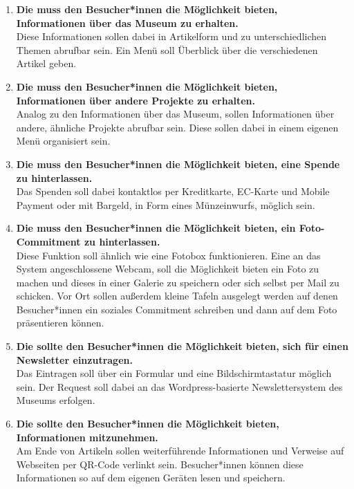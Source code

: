 \begin{enumerate}[label=\textbf{FA\arabic*}]
	\item\label{fa1} \textbf{Die \shst{} muss den Besucher*innen die Möglichkeit bieten, Informationen über das Museum zu erhalten.}\\
  Diese Informationen sollen dabei in Artikelform und zu unterschiedlichen Themen abrufbar sein. Ein Menü soll Überblick über 
  die verschiedenen Artikel geben. 
	\item\label{fa2} \textbf{Die \shst{} muss den Besucher*innen die Möglichkeit bieten, Informationen über andere Projekte zu erhalten.}\\
  Analog zu den Informationen über das Museum, sollen Informationen über andere, ähnliche Projekte abrufbar sein. Diese sollen dabei
  in einem eigenen Menü organisiert sein.
  \item\label{fa3} \textbf{Die \shst{} muss den Besucher*innen die Möglichkeit bieten, eine Spende zu hinterlassen.}\\
  Das Spenden soll dabei kontaktlos per Kreditkarte, EC-Karte und Mobile Payment oder mit Bargeld, in Form eines Münzeinwurfs, möglich sein.
  \item\label{fa4} \textbf{Die \shst{} muss den Besucher*innen die Möglichkeit bieten, ein Foto-Commitment zu hinterlassen.}\\
  Diese Funktion soll ähnlich wie eine Fotobox funktionieren. Eine an das System angeschlossene Webcam, soll die Möglichkeit bieten ein Foto 
  zu machen und dieses in einer Galerie zu speichern oder sich selbst per Mail zu schicken. Vor Ort sollen außerdem kleine Tafeln ausgelegt werden
  auf denen Besucher*innen ein soziales Commitment schreiben und dann auf dem Foto präsentieren können. 
  \item\label{fa5} \textbf{Die \shst{} sollte den Besucher*innen die Möglichkeit bieten, sich für einen Newsletter einzutragen.}\\ %
  Das Eintragen soll über ein Formular und eine Bildschirmtastatur möglich sein. Der Request soll dabei an das Wordpress-basierte 
  Newslettersystem des Museums erfolgen. 
  \item\label{fa6} \textbf{Die \shst{} sollte den Besucher*innen die Möglichkeit bieten, Informationen mitzunehmen.}\\
  Am Ende von Artikeln sollen weiterführende Informationen und Verweise auf Webseiten per QR-Code verlinkt sein. Besucher*innen können diese 
  Informationen so auf dem eigenen Geräten lesen und speichern. 

\end{enumerate}
